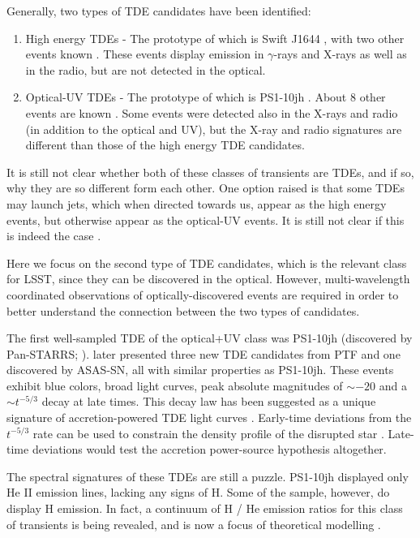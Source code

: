 Generally, two types of TDE candidates have been identified:
\begin{enumerate}
\item High energy TDEs - The prototype of which is Swift J1644 \citep{Bloom2011, Burrows2011, Levan2011, Zauderer2011}, with two
other events known \citep{Cenko2012, Brown2015}. These events display emission in $\gamma$-rays and X-rays as well as
in the radio, but are not detected in the optical. 
\item Optical-UV TDEs - The prototype of which is PS1-10jh \citep{Gezari2012}.
About $8$ other events are known \citep{Chornock2014, Arcavi2014, Holoien2014, Holoien2015, Holoien2016}.
Some events were detected also in the X-rays and radio (in addition to the optical and UV),
but the X-ray and radio signatures are different than those of the high energy TDE candidates.
\end{enumerate}

It is still not clear whether both of these classes of transients are TDEs, 
and if so, why they are so different form each other. One option raised is 
that some TDEs may launch jets, which when directed towards us, appear as
the high energy events, but otherwise appear as the optical-UV events.
It is still not clear if this is indeed the case \citep[e.g.][]{VanVelzen2013}.

Here we focus on the second type of TDE candidates, which is the relevant
class for LSST, since they can be discovered in the optical. However,
multi-wavelength coordinated observations of optically-discovered events are required in order to better 
understand the connection between the two types of candidates.

The first well-sampled TDE of the optical+UV class was PS1-10jh (discovered by Pan-STARRS;
\citealt{Gezari2012}). \citet{Arcavi2014} later presented three new TDE candidates
from PTF and one discovered by ASAS-SN, all with similar properties
as PS1-10jh. These events exhibit blue colors, broad light curves,
peak absolute magnitudes of $\sim-20$ and a $\sim t^{-5/3}$ decay
at late times. This decay law has been suggested as a unique signature
of accretion-powered TDE light curves \citep{Rees1988, Evans1989, Phinney1989}. 
Early-time deviations from the $t^{-5/3}$ rate
can be used to constrain the density profile of the disrupted star
\citep{Lodato2009, Gezari2012}. Late-time deviations would
test the accretion power-source hypothesis altogether. 

The spectral signatures of these TDEs are still a puzzle. PS1-10jh displayed
only He II emission lines, lacking any signs of H. Some of the \citet{Arcavi2014}
sample, however, do display H emission.
In fact, a continuum of H / He emission ratios for this class of transients
is being revealed, and is now a focus of theoretical modelling \citep{Strubbe2015, Roth2015}.

